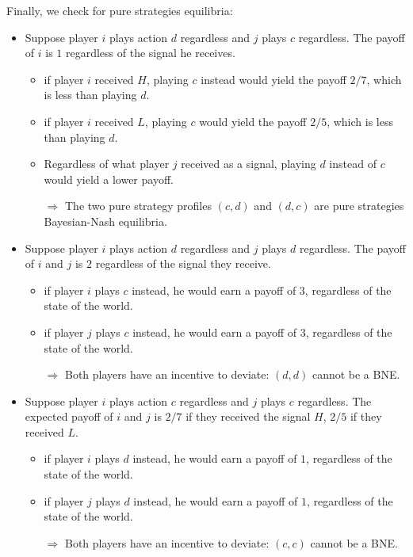 \documentclass[12pt]{report}
\begin{document}
Finally, we check for pure strategies equilibria:\begin{itemize}
\item Suppose player $i$ plays action $d$ regardless and $j$ plays $c$ regardless. The payoff of $i$ is $1$ regardless of the signal he receives.\begin{itemize}
\item if player $i$ received $H$, playing $c$ instead would yield the payoff $2/7$, which is less than playing $d$.
\item if player $i$ received $L$, playing $c$ would yield the payoff $2/5$, which is less than playing $d$.
\item Regardless of what player $j$ received as a signal, playing $d$ instead of $c$ would yield a lower payoff.
\item[$\Rightarrow$] The two pure strategy profiles $(c,d)$ and $(d,c)$ are pure strategies Bayesian-Nash equilibria.
\end{itemize}
\item Suppose player $i$ plays action $d$ regardless and $j$ plays $d$ regardless. The payoff of $i$ and $j$ is $2$ regardless of the signal they receive.\begin{itemize}
\item if player $i$ plays $c$ instead, he would earn a payoff of $3$, regardless of the state of the world.
\item if player $j$ plays $c$ instead, he would earn a payoff of $3$, regardless of the state of the world.
\item[$\Rightarrow$] Both players have an incentive to deviate: $(d,d)$ cannot be a BNE.
\end{itemize}
\item Suppose player $i$ plays action $c$ regardless and $j$ plays $c$ regardless. The expected payoff of $i$ and $j$ is $2/7$ if they received the signal $H$, $2/5$ if they received $L$.\begin{itemize}
\item if player $i$ plays $d$ instead, he would earn a payoff of $1$, regardless of the state of the world.
\item if player $j$ plays $d$ instead, he would earn a payoff of $1$, regardless of the state of the world.
\item[$\Rightarrow$] Both players have an incentive to deviate: $(c,c)$ cannot be a BNE.
\end{itemize}
\end{itemize}  
\end{document}
